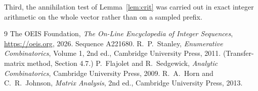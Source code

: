 \documentclass[11pt,a4paper]{article}
\theoremstyle{plain}
\theoremstyle{definition}
\begin{document}
Third, the annihilation test of Lemma~\ref{lem:crit} was carried out in exact integer
arithmetic on the whole vector rather than on a sampled prefix.

\begin{thebibliography}{9}
 The OEIS Foundation, \emph{The On-Line Encyclopedia of Integer
Sequences}, \url{https://oeis.org}, 2026. Sequence A221680.
 R.~P.~Stanley, \emph{Enumerative Combinatorics}, Volume 1, 2nd ed.,
Cambridge University Press, 2011. (Transfer-matrix method, Section 4.7.)
 P.~Flajolet and R.~Sedgewick, \emph{Analytic Combinatorics}, Cambridge
University Press, 2009.
 R.~A.~Horn and C.~R.~Johnson, \emph{Matrix Analysis}, 2nd ed., Cambridge
University Press, 2013.
\end{thebibliography}
\end{document}
